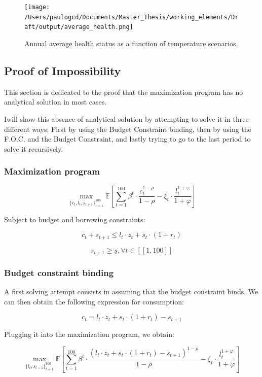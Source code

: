 \documentclass{article}
\begin{document}
\begin{figure}[H]
    \texttt{[image: /Users/paulogcd/Documents/Master\_Thesis/working\_elements/Draft/output/average\_health.png]}
    \caption{Annual average health status as a function of temperature scenarios.}
\end{figure}

\subsection{Proof of Impossibility}

This section is dedicated to the proof that the maximization program
has no analytical solution in most cases.

Iwill show this absence of analytical solution by attempting to solve it in three different 
ways: First by using the Budget Constraint binding, then by using the F.O.C. and the Budget Constraint,
and lastly trying to go to the last period to solve it recursively. 

\subsubsection{Maximization program}

$$ \max_{\{c_{t},l_{t},s_{t+1}\}_{t=1}^{100}}
{\mathbb{E}\left[\sum_{t=1}^{100} \beta^{t}\cdot \frac{c_{t}^{1-\rho}}{1-\rho}-\xi_{t}\cdot \frac{l_{t}^{1+\varphi}}{1+\varphi}\right]}$$

Subject to budget and borrowing constraints:

$$c_{t} + s_{t+1} \leq l_{t}\cdot z_{t} + s_{t}\cdot(1+r_{t})$$

$$s_{t+1}\geq \underline{s}, \forall t \in [\![1,100]\!]$$

\subsubsection{Budget constraint binding}

A first solving attempt consists in assuming that the budget constraint binds.
We can then obtain the following expression for consumption: 

$$c_{t} = l_{t}\cdot z_{t} + s_{t}\cdot(1+r_{t}) - s_{t+1}$$

Plugging it into the maximization program, we obtain:

$$ \max_{\{l_{t},s_{t+1}\}_{t=1}^{100}}
{\mathbb{E}\left[\sum_{t=1}^{100} \beta^{t}\cdot \frac{\left(l_{t}\cdot z_{t} + s_{t}\cdot(1+r_{t}) - s_{t+1}\right)^{1-\rho}}{1-\rho}-\xi_{t}\cdot \frac{l_{t}^{1+\varphi}}{1+\varphi}\right]}$$
\end{document}
